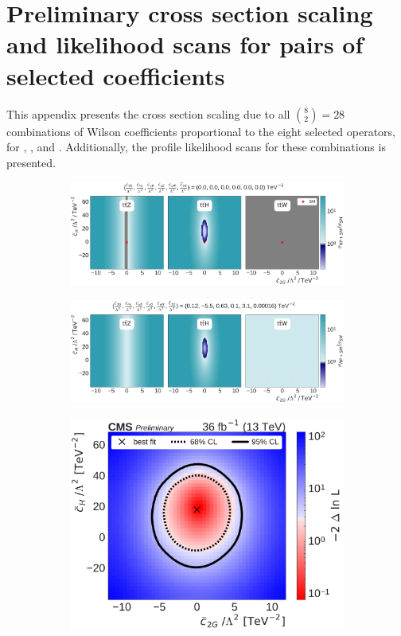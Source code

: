 \chapter{Preliminary cross section scaling and likelihood scans for pairs of selected coefficients}
\label{chap:2d-scans}

This appendix presents the cross section scaling due to all $\binom{8}{2}=28$ combinations of Wilson
coefficients proportional to the eight selected operators, for \ttW, \ttZ, and \ttH. Additionally,
the profile likelihood scans for these combinations is presented.

\begin{figure}
  \vspace{-1cm}
  \begin{subfigure}{\linewidth}
    \centering
    \includegraphics[width=\linewidth]{figures/thirteen-TeV/scaling-frozen/c2G_cH}
    \caption{}
  \end{subfigure}
  \begin{subfigure}{\linewidth}
    \centering
    \includegraphics[width=\linewidth]{figures/thirteen-TeV/scaling/c2G_cH}
    \caption{}
  \end{subfigure}
  \begin{subfigure}{\linewidth}
    \centering
    \includegraphics[width=0.6\linewidth]{figures/thirteen-TeV/nll/c2G_cH}

\end{subfigure}
\end{figure}
